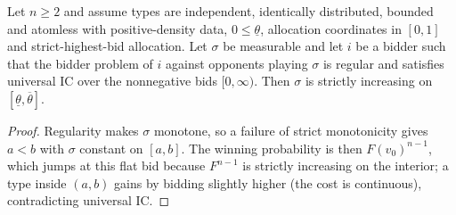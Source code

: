 \begin{theorem}\label{thm:MathEconLib.Auction.strictMonotonicity}\leanok
{}
Let $n\ge2$ and assume types are independent, identically distributed, bounded and atomless with positive-density data, $0\le\underline\theta$, allocation coordinates in $[0,1]$ and strict-highest-bid allocation. Let $\sigma$ be measurable and let $i$ be a bidder such that the bidder problem of $i$ against opponents playing $\sigma$ is regular and satisfies universal IC over the nonnegative bids $[0,\infty)$. Then $\sigma$ is strictly increasing on $[\underline\theta,\overline\theta]$.
\end{theorem}
\begin{proof}\leanok
{}
Regularity makes $\sigma$ monotone, so a failure of strict monotonicity gives $a<b$ with $\sigma$ constant on $[a,b]$. The winning probability is then $F(v_0)^{n-1}$, which jumps at this flat bid because $F^{n-1}$ is strictly increasing on the interior; a type inside $(a,b)$ gains by bidding slightly higher (the cost is continuous), contradicting universal IC.
\end{proof}
